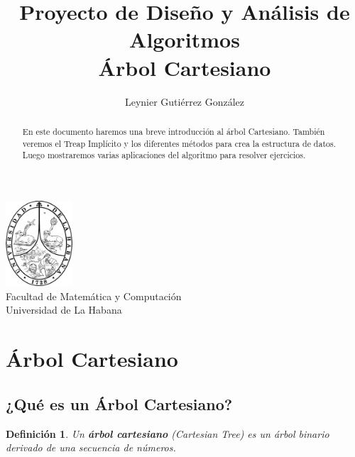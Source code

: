 \documentclass[12pt]{article}
\title{Proyecto de Diseño y Análisis de Algoritmos\\ \vspace{.2cm} \textbf{Árbol Cartesiano}}
\author{Leynier Gutiérrez González}
\newcommand{\nl}{\vspace{0.3cm}}
\newcommand{\ct}{árbol cartesiano }
\newtheorem{definition}{Definición}
\begin{document}
\maketitle

\vspace{0.5cm}

\begin{center}
	\vspace{0.2cm}
	\includegraphics[width=2.5cm]{images/escudo.png}\\
	\vspace{0.2cm}
	Facultad de Matemática y Computación\\
	\vspace{0.1cm}
	Universidad de La Habana\\
	\vspace{1cm}
\end{center}

\vspace{1cm}

\begin{abstract}
	En este documento haremos una breve introducción al árbol Cartesiano. También veremos el Treap Implícito y los diferentes métodos para crea la estructura de datos. Luego mostraremos varias aplicaciones del algoritmo para resolver ejercicios.
\end{abstract}

\newpage

\tableofcontents

\newpage

\section{Árbol Cartesiano}

\subsection{¿Qué es un Árbol Cartesiano?}

\nl

\begin{definition}
	Un \textbf{\ct}(Cartesian Tree) es un árbol binario derivado de una secuencia de números.
\end{definition}
\end{document}

